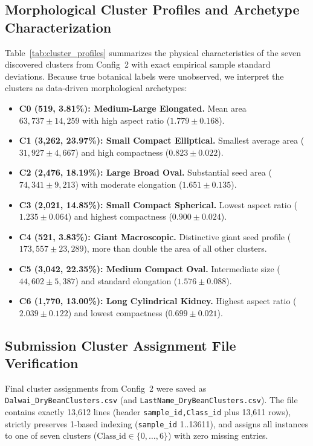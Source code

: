 \documentclass[9.5pt,twocolumn,letterpaper]{article}
\begin{document}
\subsection{Morphological Cluster Profiles and Archetype Characterization}
Table~\ref{tab:cluster_profiles} summarizes the physical characteristics of the seven discovered clusters from Config~2 with exact empirical sample standard deviations. Because true botanical labels were unobserved, we interpret the clusters as data-driven morphological archetypes:
\begin{itemize}
  \item \textbf{C0 (519, 3.81\%): Medium-Large Elongated.} Mean area $63{,}737 \pm 14{,}259$ with high aspect ratio ($1.779 \pm 0.168$).
  \item \textbf{C1 (3,262, 23.97\%): Small Compact Elliptical.} Smallest average area ($31{,}927 \pm 4{,}667$) and high compactness ($0.823 \pm 0.022$).
  \item \textbf{C2 (2,476, 18.19\%): Large Broad Oval.} Substantial seed area ($74{,}341 \pm 9{,}213$) with moderate elongation ($1.651 \pm 0.135$).
  \item \textbf{C3 (2,021, 14.85\%): Small Compact Spherical.} Lowest aspect ratio ($1.235 \pm 0.064$) and highest compactness ($0.900 \pm 0.024$).
  \item \textbf{C4 (521, 3.83\%): Giant Macroscopic.} Distinctive giant seed profile ($173{,}557 \pm 23{,}289$), more than double the area of all other clusters.
  \item \textbf{C5 (3,042, 22.35\%): Medium Compact Oval.} Intermediate size ($44{,}602 \pm 5{,}387$) and standard elongation ($1.576 \pm 0.088$).
  \item \textbf{C6 (1,770, 13.00\%): Long Cylindrical Kidney.} Highest aspect ratio ($2.039 \pm 0.122$) and lowest compactness ($0.699 \pm 0.021$).
\end{itemize}

\subsection{Submission Cluster Assignment File Verification}
Final cluster assignments from Config~2 were saved as \texttt{Dalwai\_DryBeanClusters.csv} (and \texttt{LastName\_DryBeanClusters.csv}). The file contains exactly 13,612 lines (header \texttt{sample\_id,Class\_id} plus 13,611 rows), strictly preserves 1-based indexing (\texttt{sample\_id} 1..13611), and assigns all instances to one of seven clusters ($\text{Class\_id} \in \{0, \dots, 6\}$) with zero missing entries.
\end{document}
